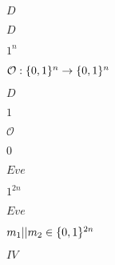 \documentclass[10pt]{book}
\begin{document}
\begin{mdSnippets}
\begin{mdInlineSnippet}[f623e75af30e62bbd73d6df5b50bb7b5]%
$D$\end{mdInlineSnippet}%
\begin{mdInlineSnippet}[f623e75af30e62bbd73d6df5b50bb7b5]%
$D$\end{mdInlineSnippet}%
\begin{mdInlineSnippet}%
$1^n$\end{mdInlineSnippet}%
\begin{mdInlineSnippet}[76e59e9a70728f3e616bf4203c40434c]%
$\mathcal{O}: \{0,1\}^n \to \{0,1\}^n$\end{mdInlineSnippet}%
\begin{mdInlineSnippet}[f623e75af30e62bbd73d6df5b50bb7b5]%
$D$\end{mdInlineSnippet}%
\begin{mdInlineSnippet}[c4ca4238a0b923820dcc509a6f75849b]%
$1$\end{mdInlineSnippet}%
\begin{mdInlineSnippet}[c739e7b1285679250be773ba8e183209]%
$\mathcal{O}$\end{mdInlineSnippet}%
\begin{mdInlineSnippet}%
$0$\end{mdInlineSnippet}%
\begin{mdInlineSnippet}%
$Eve$\end{mdInlineSnippet}%
\begin{mdInlineSnippet}[0bb2a9040d090145aff6b7570cb4f7c1]%
$1^{2n}$\end{mdInlineSnippet}%
\begin{mdInlineSnippet}%
$Eve$\end{mdInlineSnippet}%
\begin{mdInlineSnippet}[6c2a830e970a1db0f589b711412f1809]%
$m_1 || m_2 \in \{0,1\}^{2n}$\end{mdInlineSnippet}%
\begin{mdInlineSnippet}[cf482c5807b62034beeabdb795c5a689]%
$IV$\end{mdInlineSnippet}%
\begin{mdInlineSnippet}[662c461fec8fd7ac49cb83bd19211168]%

\end{mdInlineSnippet}
\end{mdSnippets}
\end{document}
